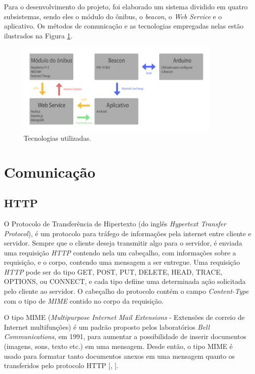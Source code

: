 \documentclass[
	12pt,				%
	oneside,			%
	a4paper,			%
	brazil				%
]{abntex2}
\newcommand{\citecustom}[1]{[\citeauthoronline{#1}, \citeyear{#1}]}
\begin{document}
Para o desenvolvimento do projeto, foi elaborado um sistema dividido em quatro subsistemas, sendo eles o módulo do ônibus, o \textit{beacon}, o \textit{Web Service} e o aplicativo. Os métodos de comunicação e as tecnologias empregadas nelas estão ilustrados na Figura \ref{tecnologias}. 

\begin{figure}[H]
\centering
\includegraphics[width=10cm, center]{images/tech}
\caption{Tecnologias utilizadas.}
\label{tecnologias}
\end{figure}

\section{Comunicação}

\subsection{HTTP}

O Protocolo de Transferência de Hipertexto (do inglês \textit{Hypertext Transfer Protocol}), é um protocolo para tráfego de informações pela internet entre cliente e servidor. Sempre que o cliente deseja transmitir algo para o servidor, é enviada uma requisição \textit{HTTP} contendo nela um cabeçalho, com informações sobre a requisição, e o corpo, contendo uma mensagem a ser entregue. Uma requisição \textit{HTTP} pode ser do tipo GET, POST, PUT, DELETE, HEAD, TRACE, OPTIONS, ou CONNECT, e cada tipo defiine uma determinada ação solicitada pelo cliente ao servidor.
O cabeçalho do protocolo contém o campo \textit{Content-Type} com o tipo de \textit{MIME} contido no corpo da requisição. 

O tipo MIME (\textit{Multipurpose Internet Mail Extensions} - Extensões de correio de Internet multifunções) é um padrão proposto pelos laboratórios \textit{Bell Communications}, em 1991, para aumentar a possibilidade de inserir documentos (imagens, sons, texto etc.) em uma mensagem. Desde então, o tipo MIME é usado para formatar tanto documentos anexos em uma mensagem quanto os transferidos pelo protocolo HTTP \citecustom{CCM2017}.
\end{document}
